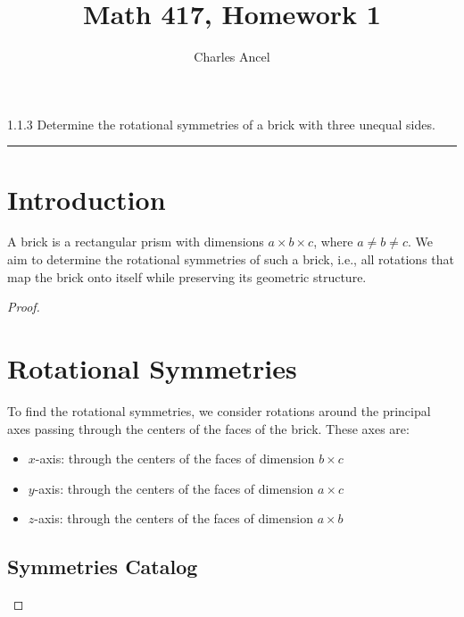 \documentclass[12pt]{amsart}
\title{Math 417, Homework 1}
\author{Charles Ancel}
\theoremstyle{definition}
\numberwithin{equation}{section}
\begin{document}
\maketitle

\begin{exercise}{1.1.3} Determine the rotational symmetries of a brick with three unequal sides.
    \noindent\rule{\linewidth}{1pt}
    \section{Introduction}
    A brick is a rectangular prism with dimensions \(a \times b \times c\), where \(a \neq b \neq c\). We aim to determine the rotational symmetries of such a brick, i.e., all rotations that map the brick onto itself while preserving its geometric structure.
    
    \begin{proof}
    \section{Rotational Symmetries}
    To find the rotational symmetries, we consider rotations around the principal axes passing through the centers of the faces of the brick. These axes are:
    \begin{itemize}[label=--]
        \item \(x\)-axis: through the centers of the faces of dimension \(b \times c\)
        \item \(y\)-axis: through the centers of the faces of dimension \(a \times c\)
        \item \(z\)-axis: through the centers of the faces of dimension \(a \times b\)
    \end{itemize}
        
    \subsection{Symmetries Catalog}


\end{proof}
\end{exercise}
\end{document}
